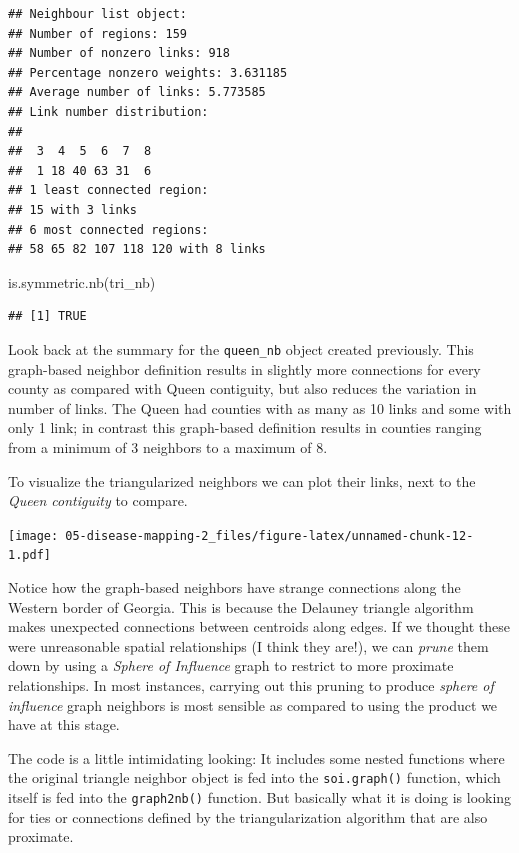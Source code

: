 \documentclass[
]{book}
\newenvironment{Shaded}{\begin{snugshade}}{\end{snugshade}}
\newcommand{\FunctionTok}[1]{\textcolor[rgb]{0.00,0.00,0.00}{#1}}
\newcommand{\NormalTok}[1]{#1}
\begin{document}
\begin{verbatim}
## Neighbour list object:
## Number of regions: 159 
## Number of nonzero links: 918 
## Percentage nonzero weights: 3.631185 
## Average number of links: 5.773585 
## Link number distribution:
## 
##  3  4  5  6  7  8 
##  1 18 40 63 31  6 
## 1 least connected region:
## 15 with 3 links
## 6 most connected regions:
## 58 65 82 107 118 120 with 8 links
\end{verbatim}

\begin{Shaded}
\begin{Highlighting}[]
\FunctionTok{is.symmetric.nb}\NormalTok{(tri\_nb)}
\end{Highlighting}
\end{Shaded}

\begin{verbatim}
## [1] TRUE
\end{verbatim}

Look back at the summary for the \texttt{queen\_nb} object created previously. This graph-based neighbor definition results in slightly more connections for every county as compared with Queen contiguity, but also reduces the variation in number of links. The Queen had counties with as many as 10 links and some with only 1 link; in contrast this graph-based definition results in counties ranging from a minimum of 3 neighbors to a maximum of 8.

To visualize the triangularized neighbors we can plot their links, next to the \emph{Queen contiguity} to compare.

\texttt{[image: 05-disease-mapping-2\_files/figure-latex/unnamed-chunk-12-1.pdf]}

Notice how the graph-based neighbors have strange connections along the Western border of Georgia. This is because the Delauney triangle algorithm makes unexpected connections between centroids along edges. If we thought these were unreasonable spatial relationships (I think they are!), we can \emph{prune} them down by using a \emph{Sphere of Influence} graph to restrict to more proximate relationships. In most instances, carrying out this pruning to produce \emph{sphere of influence} graph neighbors is most sensible as compared to using the product we have at this stage.

The code is a little intimidating looking: It includes some nested functions where the original triangle neighbor object is fed into the \texttt{soi.graph()} function, which itself is fed into the \texttt{graph2nb()} function. But basically what it is doing is looking for ties or connections defined by the triangularization algorithm that are also proximate.
\end{document}
